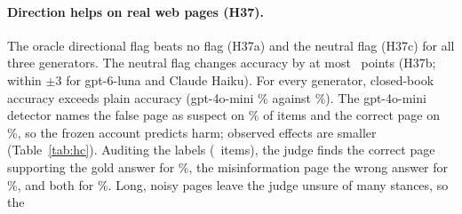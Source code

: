 \paragraph{Direction helps on real web pages (H37).} The oracle directional
flag beats no flag (H37a) and the neutral flag (H37c) for all three generators. The neutral flag changes accuracy by at
most \ahcNeuMini\ points (H37b; within $\pm$3 for gpt-6-luna and Claude Haiku). For every generator, closed-book accuracy exceeds plain accuracy (gpt-4o-mini \hcCbMini\% against \hcPlainMini\%). The gpt-4o-mini detector names
the false page as suspect on \hcLlmRightMini\% of items and the correct page on \hcLlmWrongMini\%, so the frozen account
predicts harm; observed effects are smaller (Table~\ref{tab:hc}). Auditing the labels (\hcLabN\ items), the judge
finds the correct page supporting the gold answer for \hcLabCorrect\%, the misinformation page the wrong answer for
\hcLabMis\%, and both for \hcLabBoth\%. Long, noisy pages leave the judge unsure of many stances, so the